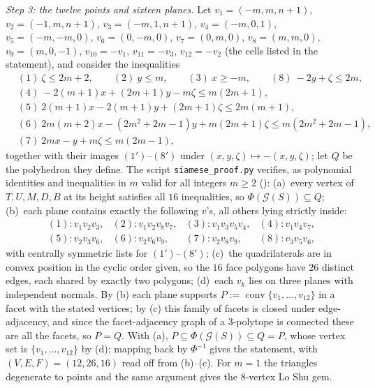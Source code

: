 \emph{Step 3: the twelve points and sixteen planes.}  Let
$v_1=(-m,m,n{+}1)$, $v_2=(-1,m,n{+}1)$, $v_3=(-m,1,n{+}1)$, $v_4=(-m,0,1)$,
$v_5=(-m,-m,0)$, $v_6=(0,-m,0)$, $v_7=(0,m,0)$, $v_8=(m,m,0)$, $v_9=(m,0,-1)$,
$v_{10}=-v_1$, $v_{11}=-v_3$, $v_{12}=-v_2$ (the cells listed in the statement), and consider the inequalities
\begin{align*}
&(1)\ \zeta\le 2m+2, \qquad (2)\ y\le m, \qquad (3)\ x\ge -m, \qquad (8)\ -2y+\zeta\le 2m,\\
&(4)\ -2(m{+}1)x+(2m{+}1)y-m\zeta\le m(2m{+}1),\\
&(5)\ 2(m{+}1)x-2(m{+}1)y+(2m{+}1)\zeta\le 2m(m{+}1),\\
&(6)\ 2m(m{+}2)x-(2m^2{+}2m{-}1)y+m(2m{+}1)\zeta\le m(2m^2{+}2m{-}1),\\
&(7)\ 2mx-y+m\zeta\le m(2m{-}1),
\end{align*}
together with their images $(1')$--$(8')$ under $(x,y,\zeta)\mapsto-(x,y,\zeta)$; let $Q$ be the polyhedron they define.
The script \texttt{siamese\_proof.py} verifies, as polynomial identities and inequalities in $m$ valid for all integers $m\ge2$
(): (a)~every vertex of $T,U,M,D,B$ at its height satisfies all $16$ inequalities, so
$\Phi(\mathcal G(S))\subseteq Q$; (b)~each plane contains exactly the following $v$'s, all others lying strictly inside:
\[
\begin{array}{llll}
(1)\colon v_1v_2v_3, & (2)\colon v_1v_2v_8v_7, & (3)\colon v_1v_3v_5v_4, & (4)\colon v_1v_4v_7,\\
(5)\colon v_2v_3v_6, & (6)\colon v_2v_6v_9, & (7)\colon v_2v_8v_9, & (8)\colon v_3v_5v_6,
\end{array}
\]
with centrally symmetric lists for $(1')$--$(8')$; (c)~the quadrilaterals are in convex position in the cyclic order given, so
the $16$ face polygons have $26$ distinct edges, each shared by exactly two polygons; (d)~each $v_k$ lies on three planes with
independent normals.  By (b) each plane supports $P:=\operatorname{conv}\{v_1,\dots,v_{12}\}$ in a facet with the stated vertices;
by (c) this family of facets is closed under edge-adjacency, and since the facet-adjacency graph of a $3$-polytope is connected
these are all the facets, so $P=Q$.  With (a), $P\subseteq\Phi(\mathcal G(S))\subseteq Q=P$, whose vertex set is
$\{v_1,\dots,v_{12}\}$ by (d); mapping back by $\Phi^{-1}$ gives the statement, with $(V,E,F)=(12,26,16)$ read off from (b)--(c).
For $m=1$ the triangles degenerate to points and the same argument gives the $8$-vertex Lo Shu gem.
